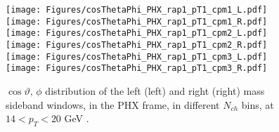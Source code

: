 \documentclass[12pt]{article}
\newcommand{\pt}{$p_{\mathrm{T}}$}
\begin{document}
%
%


\begin{figure}[htbp]
\centering
\texttt{[image: Figures/cosThetaPhi\_PHX\_rap1\_pT1\_cpm1\_L.pdf]}
\texttt{[image: Figures/cosThetaPhi\_PHX\_rap1\_pT1\_cpm1\_R.pdf]}
\texttt{[image: Figures/cosThetaPhi\_PHX\_rap1\_pT1\_cpm2\_L.pdf]}
\texttt{[image: Figures/cosThetaPhi\_PHX\_rap1\_pT1\_cpm2\_R.pdf]}
\texttt{[image: Figures/cosThetaPhi\_PHX\_rap1\_pT1\_cpm3\_L.pdf]}
\texttt{[image: Figures/cosThetaPhi\_PHX\_rap1\_pT1\_cpm3\_R.pdf]}
\caption{$\cos\vartheta,\,\phi$ distribution of the left (left) and
  right (right) mass sideband windows, in the PHX frame, in different
  $N_{ch}$ bins, at $14 < p_{T} < 20$ GeV .}
\end{figure}
\clearpage
\end{document}

